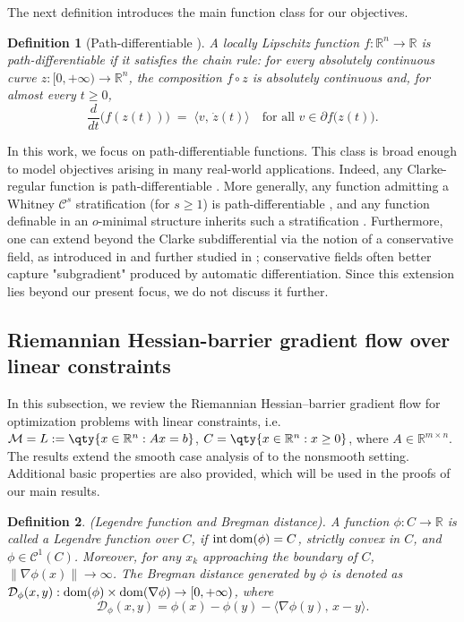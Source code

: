 \documentclass[11pt]{article}
\newcommand{\R}{\mathbb R}
\newcommand{\cC}{\mathcal C}
\newcommand{\cD}{\mathcal D}
\newcommand{\cM}{\mathcal M}
\def\norm#1{\left\|#1\right\|}
\def\inprod#1#2{\langle#1,\,#2\rangle}
\newtheorem{definition}{Definition}[section]
\begin{document}
The next definition introduces the main function class for our objectives.

\begin{definition}[Path-differentiable {\cite{davis2020stochastic,bolte2021conservative}}]
\label{def:path-differentiable}
A locally Lipschitz function \(f\colon\R^n\to\R\) is \emph{path-differentiable} if it satisfies the chain rule: for every absolutely continuous curve \(z\colon[0,+\infty)\to\R^n\), the composition \(f\circ z\) is absolutely continuous and, for almost every \(t\ge0\),
\[
\frac{d}{dt}\bigl(f(z(t))\bigr)
\;=\;
\bigl\langle v,\,\dot z(t)\bigr\rangle
\quad\text{for all }v\in\partial f\bigl(z(t)\bigr).
\]
\end{definition}

In this work, we focus on path-differentiable functions. This class is broad enough to model objectives arising in many real-world applications. Indeed, any Clarke-regular function is path‐differentiable \cite[Section 5.1]{davis2020stochastic}. More generally, any function admitting a Whitney \(\cC^s\) stratification (for \(s\ge1\)) is path-differentiable \cite[Definition 5.6]{davis2020stochastic}, and any function definable in an \(o\)-minimal structure inherits such a stratification \cite[Definition 5.10]{davis2020stochastic}. Furthermore, one can extend beyond the Clarke subdifferential via the notion of a {conservative field}, as introduced in \cite{bolte2021conservative} and further studied in \cite{castera2021inertial,xiao2023adam,le2023nonsmooth,ding2023adam,xiao2024developing}; conservative fields often better capture "subgradient" produced by automatic differentiation. Since this extension lies beyond our present focus, we do not discuss it further.


\subsection{Riemannian Hessian-barrier gradient flow over linear constraints}
In this subsection, we review the Riemannian Hessian–barrier gradient flow for optimization problems with linear constraints, i.e. $\cM=L:=\qty{x\in\R^n:Ax=b}$, $C=\qty{x\in\R^n:x\geq0}$, where $A\in\R^{m\times n}$. The results extend the smooth case analysis of \cite{alvarez2004hessian,bomze2019hessian} to the nonsmooth setting. Additional basic properties are also provided, which will be used in the proofs of our main results. 

\begin{definition}\label{Bregman-distance-def}
(Legendre function and Bregman distance).  A function $\phi:C\rightarrow\R$ is called a Legendre function over $C$, if ${\rm int\,dom}(\phi)=C$, strictly convex in $C$, and $\phi\in\cC^1(C)$. Moreover, for any $x_k$ approaching the boundary of $C$, $\norm{\nabla\phi(x)}\to\infty$. The Bregman distance \cite{bregman1967relaxation} generated by $\phi$ is denoted as $\cD_\phi(x,y):{\rm dom}(\phi)\times{\rm dom}(\nabla\phi)\rightarrow[0,+\infty)$, where
\[
\cD_\phi(x,y)=\phi(x)-\phi(y)-\inprod{\nabla\phi(y)}{x-y}.
\]
\end{definition}
\end{document}

